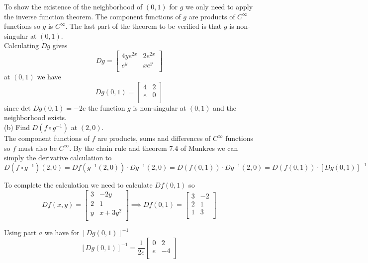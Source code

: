 \documentclass[11pt,reqno]{article}
\begin{document}
\noindent To show the existence of the neighborhood of $(0,1)$ for $g$ we only need to apply the inverse function theorem. The component functions of $g$ are products of $C^\infty$ functions so $g$ is $C^\infty$. The last part of the theorem to be verified is that $g$ is non-singular at $(0,1)$.\\
Calculating $D g$ gives
\[ D g = \left[ \begin{array}{cc}
4 y e^{2x} & 2 e^{2x} \\
e^y & x e^y \\
\end{array} \right] \]
\noindent at $(0,1)$ we have
\[ D g(0,1) = \left[ \begin{array}{cc}
4 & 2 \\
e & 0 \\
\end{array} \right] \]
since det $D g(0,1) = -2e$ the function $g$ is non-singular at $(0,1)$ and the neighborhood exists.\\

\noindent (b) Find $D(f \circ g^{-1})$ at $(2,0)$.\\

The component functions of $f$ are products, sums and differences of $C^\infty$ functions so $f$ must also be $C^\infty$. By the chain rule and theorem 7.4 of Munkres we can simply the derivative calculation to
\[D(f \circ g^{-1}) (2,0) = D f (g^{-1} (2,0)) \cdot D g^{-1} (2,0) = D(f(0,1)) \cdot D g^{-1} (2,0) = D(f(0,1)) \cdot [D g (0,1)]^{-1} \]

\noindent To complete the calculation we need to calculate $D f(0,1)$ so
\[ D f(x,y) = \left[ \begin{array}{cc}
3 & -2 y \\
2 & 1 \\
y & x + 3 y^2 \\
\end{array} \right]  \implies D f(0,1) = \left[ \begin{array}{cc}
3 & -2 \\
2 & 1 \\
1 & 3 \\
\end{array} \right] \]

\noindent Using part $a$ we have for $[D g (0,1)]^{-1}$
\[
[D g (0,1)]^{-1} = \frac{1}{2 e} \left[ \begin{array}{cc}
0 & 2 \\
e & -4 \\
\end{array} \right] \]
\end{document}
